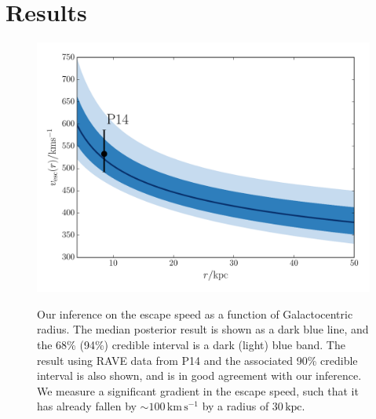\documentclass[useAMS,twocolumn,usenatbib]{mn2e}
\def\kpc{{\,\mathrm{kpc}}}
\def\kms{{\,\mathrm{km\,s^{-1}}}}
\begin{document}
\section{Results}

\label{sec:res}

\begin{figure}
\includegraphics[width=\columnwidth]{plots/vesc_posterior}\\
\caption{Our inference on the escape speed as a function of Galactocentric radius. 
The median posterior result is shown as a {} dark blue line, and the 68\% (94\%) credible interval is a dark (light) blue band. 
The result using RAVE data from P14 and the associated 90\% credible interval is also shown, and is in good agreement with our inference. 
We measure a significant gradient in the escape speed, such that it has already fallen by $\sim 100\kms$ by  a radius of $30\kpc$.}
\label{fig:vesc_posterior}
\end{figure}
\end{document}
